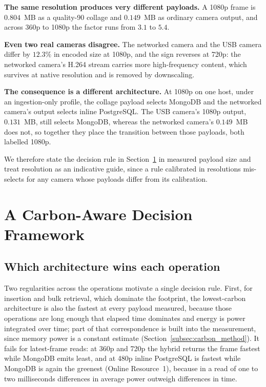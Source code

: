 \documentclass[pdflatex,sn-basic]{sn-jnl}%
\begin{document}
{\color{markup}\textbf{The same resolution produces very different payloads.} A 1080p frame is $0.804$~MB as a quality-90 collage and $0.149$~MB as ordinary camera output, and across 360p to 1080p the factor runs from $3.1$ to $5.4$.}

{\color{markup}\textbf{Even two real cameras disagree.} The networked camera and the USB camera differ by $12.3\%$ in encoded size at 1080p, and the sign reverses at 720p: the networked camera's H.264 stream carries more high-frequency content, which survives at native resolution and is removed by downscaling.}

{\color{markup}\textbf{The consequence is a different architecture.} At 1080p on one host, under an ingestion-only profile, the collage payload selects MongoDB and the networked camera's output selects inline PostgreSQL.} {\color{markup}The USB camera's 1080p output, $0.131$~MB, still selects MongoDB, whereas the networked camera's $0.149$~MB does not, so together they place the transition between those payloads, both labelled 1080p.}

{\color{markup}We therefore state the decision rule in Section~\ref{sec:framework} in measured payload size and treat resolution as an indicative guide, since a rule calibrated in resolutions mis-selects for any camera whose payloads differ from its calibration.}

\section{A Carbon-Aware Decision Framework}\label{sec:framework}

\subsection{Which architecture wins each operation}\label{subsec:winners}
{\color{markup}Two regularities across the operations motivate a single decision rule.} {\color{markup}First, for insertion and bulk retrieval, which dominate the footprint, the lowest-carbon architecture is also the fastest at every payload measured, because those operations are long enough that elapsed time dominates and energy is power integrated over time; part of that correspondence is built into the measurement, since memory power is a constant estimate (Section~\ref{subsec:carbon_method}).} {\color{markup}It fails for latest-frame reads: at 360p and 720p the hybrid returns the frame fastest while MongoDB emits least, and at 480p inline PostgreSQL is fastest while MongoDB is again the greenest (Online Resource~1), because in a read of one to two milliseconds differences in average power outweigh differences in time.}
\end{document}
